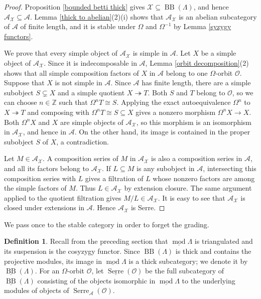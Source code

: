 \documentclass{amsart}
\theoremstyle{definition}
\newtheorem{dfn}[thm]{Definition}
\theoremstyle{remark}
\numberwithin{equation}{thm}
\def\A{\mathcal{A}}
\def\BB{\operatorname{BB}}
\def\L{\Lambda}
\def\mod{\operatorname{mod}}
\def\O{\mathcal{O}}
\def\Serre{\operatorname{Serre}}
\def\X{\mathcal{X}}
\def\Z{\mathbb{Z}}
\begin{document}
\begin{proof}
Proposition \ref{bounded betti thick} gives $\X\subseteq\BB(\L)$, and hence $\A_\X\subseteq\A$.  Lemma \ref{thick to abelian}(2)(i) shows that $\A_\X$ is an abelian subcategory of $\A$ of finite length, and  it is stable under $\Omega$ and $\Omega^{-1}$ by Lemma \ref{syzygy functors}.

We prove that every simple object of $\A_\X$ is simple in $\A$.
Let $X$ be a simple object of $\A_\X$. Since it is indecomposable in $\A$, Lemma \ref{orbit decomposition}(2) shows that all simple composition factors of $X$ in $\A$ belong to one $\Omega$-orbit $\O$.
Suppose that $X$ is not simple in $\A$.  Since $\A$ has finite length, there are a simple subobject $S\subsetneq X$ and a simple quotient $X\twoheadrightarrow T$.  Both $S$ and $T$ belong to $\O$, so we can choose $n\in\Z$ such that $\Omega^nT\cong S$.  Applying the exact autoequivalence $\Omega^n$ to $X\twoheadrightarrow T$ and composing with $\Omega^nT\cong S\subseteq X$ gives a nonzero morphism $\Omega^nX\to X$.
Both $\Omega^nX$ and $X$ are simple objects of $\A_\X$, so this morphism is an isomorphism in $\A_\X$, and hence in $\A$.  On the other hand, its image is contained in the proper subobject $S$ of $X$, a contradiction. 

Let $M\in\A_\X$.  A composition series of $M$ in $\A_\X$ is also a composition series in $\A$, and all its factors belong to $\A_\X$.  If $L\subseteq M$ is any subobject in $\A$, intersecting this composition series with $L$ gives a filtration of $L$ whose nonzero factors are among the simple factors of $M$.  Thus $L\in\A_\X$ by extension closure.  The same argument applied to the quotient filtration gives $M/L\in\A_\X$.
It is easy to see that $\A_\X$ is closed under extensions in $\A$.
Hence $\A_\X$ is Serre.
\end{proof}

We pass once to the stable category in order to forget the grading. 

\begin{dfn}
Recall from the preceding section that $\underline{\mod}\L$ is triangulated and its suspension is the cosyzygy functor.  Since $\BB(\L)$ is thick and contains the projective modules, its image in $\underline{\mod}\L$ is a thick subcategory; we denote it by $\underline{\BB}(\L)$.
For an $\Omega$-orbit $\O$, let $\underline{\Serre}(\O)$ be the full subcategory of $\underline{\BB}(\L)$ consisting of the objects isomorphic in $\underline{\mod}\L$ to the underlying modules of objects of $\Serre_{\A}(\O)$.
\end{dfn}
\end{document}
